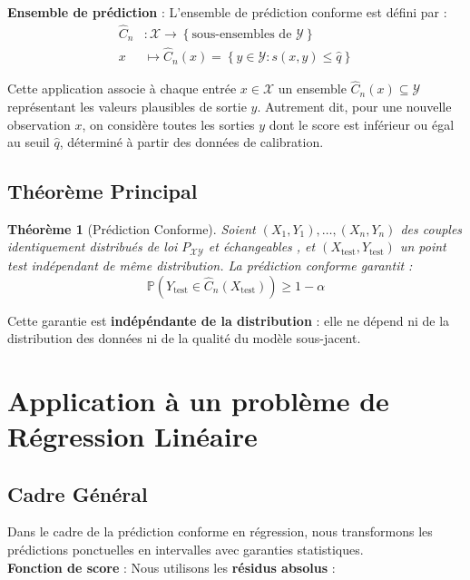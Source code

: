 \documentclass[a4paper,12pt]{article}
\newtheorem{theorem}{Théorème}
\begin{document}
\textbf{Ensemble de prédiction} : L'ensemble de prédiction conforme est défini par :
\[
\begin{aligned}
\hat{C}_n &: \mathcal{X} \rightarrow \left\{ \text{sous-ensembles de } \mathcal{Y} \right\} \\
   x &\mapsto \hat{C}_n(x) = \left\{ y \in \mathcal{Y} : s(x, y) \leq \hat{q} \right\}
\end{aligned}
\]

    Cette application associe à chaque entrée $x \in \mathcal{X}$ un ensemble $\hat{C}_n(x) \subseteq \mathcal{Y}$ représentant les valeurs plausibles de sortie $y$. 
    Autrement dit, pour une nouvelle observation $x$, on considère toutes les sorties $y$ dont le score est inférieur ou égal au seuil $\hat{q}$, déterminé à partir des données de calibration. 



\subsection{Théorème Principal}

\begin{theorem}[Prédiction Conforme]
Soient $(X_1, Y_1), \ldots, (X_n, Y_n)$ des couples identiquement distribués de loi $P_{\mathcal{X} \mathcal{Y}}$ et échangeables , et $(X_{\text{test}}, Y_{\text{test}})$ un point test indépendant de même distribution. La prédiction conforme garantit :
$$\mathbb{P}\left( Y_{\text{test}} \in \hat{C}_n(X_{\text{test}}) \right) \geq 1 - \alpha$$
\end{theorem}

Cette garantie est \textbf{indépéndante de la distribution} : elle ne dépend ni de la distribution des données ni de la qualité du modèle sous-jacent.

\section{Application à un problème de Régression Linéaire}

\subsection{Cadre Général}

Dans le cadre de la prédiction conforme en régression, nous transformons les prédictions ponctuelles en intervalles avec garanties statistiques.\\

\textbf{Fonction de score} : Nous utilisons les \textbf{résidus absolus} : 
\end{document}
